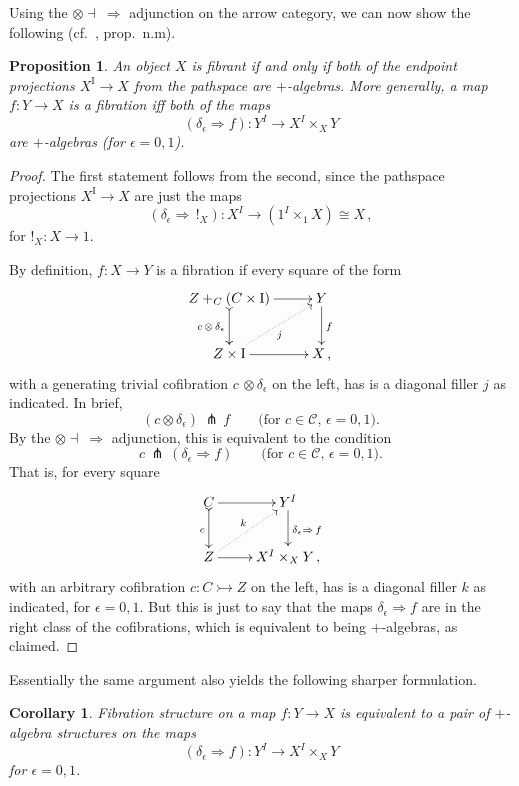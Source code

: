 \documentclass[11pt]{article}
\newcommand{\mono}{\ensuremath{\rightarrowtail}}
\newcommand{\I}{\ensuremath{\mathrm{I}}}
\newtheorem{proposition}[theorem]{Proposition}
\newtheorem{corollary}[theorem]{Corollary}
\theoremstyle{remark}
\theoremstyle{definition}
\begin{document}
Using the $\otimes\dashv\ \Rightarrow$ adjunction on the arrow category, we can now show the following (cf.~\cite{GG}, prop.~n.m).

\begin{proposition}\label{prop:algequivfill}
An object $X$ is fibrant if and only if both of the endpoint  projections $X^\I \to X$ from the pathspace are $+$-algebras. More generally, a map $f : Y\to X$ is a fibration iff both of the maps $$(\delta_\epsilon \Rightarrow f) : Y^I \to X^I\times_X Y$$ are $+$-algebras (for $\epsilon = 0,1$).
\end{proposition}
\begin{proof}
The first statement follows from the second, since the pathspace projections $X^\I \to X$  are just the maps 
$$(\delta_\epsilon \Rightarrow\, !_X) : X^I \to (1^I\times_1 X) \cong X\,,$$
for $!_X : X \to 1$.

By definition, $f : X\to Y$ is a fibration if every square of the form
\begin{equation}
\xymatrix{
Z +_C (C\times\I) \ar@{>->}[d]_{c\, \otimes\, \delta_\epsilon} \ar[r] & Y \ar[d]^f \\
Z\times \I \ar@{.>}[ru]_{j} \ar[r] & X\,,
}
\end{equation}
with a generating trivial cofibration $c\, \otimes \delta_\epsilon$ on the left, has is a diagonal filler $j$ as indicated. In brief,
\[
(c\otimes\delta_\epsilon)\, \pitchfork\, f \qquad\text{(for $c\in \mathcal{C}$, $\epsilon = 0,1$)}.
\]
By the $\otimes\dashv\ \Rightarrow$ adjunction, this is equivalent to the condition  
\[
c\, \pitchfork\, (\delta_\epsilon\!\Rightarrow\! f) \qquad\text{(for $c\in \mathcal{C}$, $\epsilon = 0,1$)}.
\]
That is, for every square 
\begin{equation*}
\xymatrix{
C \ar@{>->}[d]_{c} \ar[r] & Y^I \ar[d]^{\delta_\epsilon \Rightarrow\,f} \\
Z \ar@{.>}[ru]^{k} \ar[r] & X^I\times_X Y\,,
}
\end{equation*}
with an arbitrary cofibration $c : C \mono Z$ on the left, has is a diagonal filler $k$ as indicated, for  $\epsilon = 0,1$. 
But this is just to say that the maps $\delta_\epsilon\Rightarrow{f}$ are in the right class of the cofibrations, which is equivalent to being $+$-algebras, as claimed.
\end{proof}

Essentially the same argument also yields the following sharper formulation.
\begin{corollary}
Fibration structure on a map $f : Y\to X$ is equivalent to a pair of $+$-algebra structures on the maps $$(\delta_\epsilon\Rightarrow{f}) : Y^I \to X^I\times_X Y$$ for $\epsilon = 0,1$.
\end{corollary}
\end{document}
